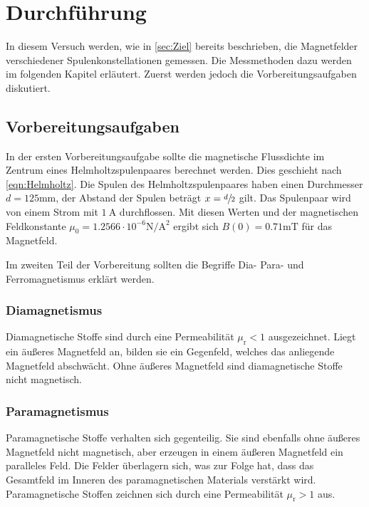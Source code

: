\section{Durchführung}
\label{sec:Durchführung}
In diesem Versuch werden, wie in \autoref{sec:Ziel} bereits beschrieben, die Magnetfelder verschiedener Spulenkonstellationen gemessen. Die Messmethoden dazu werden im folgenden 
Kapitel erläutert. Zuerst werden jedoch die Vorbereitungsaufgaben diskutiert.
\subsection{Vorbereitungsaufgaben}
\label{subsec:VBA}
In der ersten Vorbereitungsaufgabe sollte die magnetische Flussdichte im Zentrum eines Helmholtzspulenpaares berechnet werden. Dies geschieht nach \autoref{eqn:Helmholtz}.
Die Spulen des Helmholtzspulenpaares haben einen Durchmesser $d = 125\unit{\milli\metre}$, der Abstand der Spulen beträgt $x = \sfrac{d}{2}$ gilt. Das Spulenpaar 
wird von einem Strom mit $1 \: \unit{\ampere}$ durchflossen. Mit diesen Werten und der magnetischen Feldkonstante 
$\mu_0 = 1.2566\cdot 10^{-6} \unit{\newton\per\ampere\squared}$\cite{scipy} ergibt sich $B(0) = 0.71\unit{\milli\tesla}$ für das Magnetfeld. 

Im zweiten Teil der Vorbereitung sollten die Begriffe Dia- Para- und Ferromagnetismus erklärt werden. 
\subsubsection{Diamagnetismus}
\label{subsubsec:DIA}
Diamagnetische Stoffe sind durch eine Permeabilität $\mu_{\text{r}} < 1$ ausgezeichnet. Liegt ein äußeres Magnetfeld an, bilden sie ein Gegenfeld, welches das anliegende Magnetfeld
abschwächt. Ohne äußeres Magnetfeld sind diamagnetische Stoffe nicht magnetisch. 
\subsubsection{Paramagnetismus}
\label{subsubsec:PARA}
Paramagnetische Stoffe verhalten sich gegenteilig. Sie sind ebenfalls ohne äußeres Magnetfeld nicht magnetisch, aber erzeugen in einem äußeren Magnetfeld ein paralleles Feld.
Die Felder überlagern sich, was zur Folge hat, dass das Gesamtfeld im Inneren des paramagnetischen Materials verstärkt wird. Paramagnetische Stoffen zeichnen sich durch eine 
Permeabilität $\mu_{\text{r}} > 1$ aus. 
